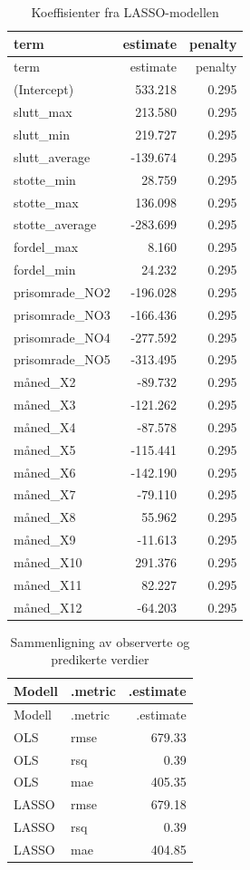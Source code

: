 \documentclass[
  letterpaper,
  DIV=11,
  numbers=noendperiod]{scrartcl}
\begin{document}
\begin{longtable}[]{@{}lrr@{}}
\caption{Koeffisienter fra LASSO-modellen}\tabularnewline
\toprule\noalign{}
term & estimate & penalty \\
\midrule\noalign{}
\endfirsthead
\toprule\noalign{}
term & estimate & penalty \\
\midrule\noalign{}
\endhead
\bottomrule\noalign{}
\endlastfoot
(Intercept) & 533.218 & 0.295 \\
slutt\_max & 213.580 & 0.295 \\
slutt\_min & 219.727 & 0.295 \\
slutt\_average & -139.674 & 0.295 \\
stotte\_min & 28.759 & 0.295 \\
stotte\_max & 136.098 & 0.295 \\
stotte\_average & -283.699 & 0.295 \\
fordel\_max & 8.160 & 0.295 \\
fordel\_min & 24.232 & 0.295 \\
prisomrade\_NO2 & -196.028 & 0.295 \\
prisomrade\_NO3 & -166.436 & 0.295 \\
prisomrade\_NO4 & -277.592 & 0.295 \\
prisomrade\_NO5 & -313.495 & 0.295 \\
måned\_X2 & -89.732 & 0.295 \\
måned\_X3 & -121.262 & 0.295 \\
måned\_X4 & -87.578 & 0.295 \\
måned\_X5 & -115.441 & 0.295 \\
måned\_X6 & -142.190 & 0.295 \\
måned\_X7 & -79.110 & 0.295 \\
måned\_X8 & 55.962 & 0.295 \\
måned\_X9 & -11.613 & 0.295 \\
måned\_X10 & 291.376 & 0.295 \\
måned\_X11 & 82.227 & 0.295 \\
måned\_X12 & -64.203 & 0.295 \\
\end{longtable}

\begin{longtable}[]{@{}llr@{}}
\caption{Sammenligning av observerte og predikerte
verdier}\tabularnewline
\toprule\noalign{}
Modell & .metric & .estimate \\
\midrule\noalign{}
\endfirsthead
\toprule\noalign{}
Modell & .metric & .estimate \\
\midrule\noalign{}
\endhead
\bottomrule\noalign{}
\endlastfoot
OLS & rmse & 679.33 \\
OLS & rsq & 0.39 \\
OLS & mae & 405.35 \\
LASSO & rmse & 679.18 \\
LASSO & rsq & 0.39 \\
LASSO & mae & 404.85 \\
\end{longtable}
\end{document}
